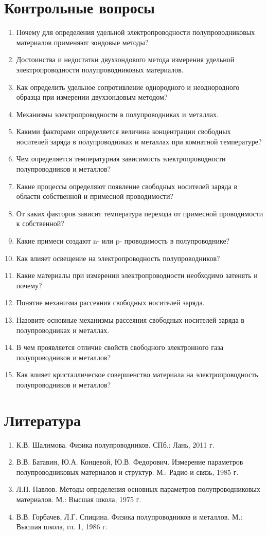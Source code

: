 \section{Контрольные вопросы}
\begin{enumerate}
\item Почему для определения удельной электропроводности полупроводниковых материалов применяют зондовые методы?
\item Достоинства и недостатки двухзондового метода измерения удельной электропроводности полупроводниковых материалов.
\item Как определить удельное сопротивление однородного и неоднородного образца при измерении двухзондовым методом?
\item Механизмы электропроводности в полупроводниках и металлах.
\item Какими факторами определяется величина концентрации свободных носителей заряда в полупроводниках и металлах при комнатной температуре?
\item Чем определяется температурная зависимость электропроводности полупроводников и металлов?
\item Какие процессы определяют появление свободных носителей заряда в области собственной и примесной проводимости?
\item От каких факторов зависит температура перехода от примесной проводимости к собственной?
\item Какие примеси создают n- или p- проводимость в полупроводнике?
\item Как влияет освещение на электропроводность полупроводников?
\item Какие материалы при измерении электропроводности необходимо затенять и почему?
\item Понятие механизма рассеяния свободных носителей заряда.
\item Назовите основные механизмы рассеяния свободных носителей заряда в полупроводниках и металлах.
\item В чем проявляется отличие свойств свободного электронного газа полупроводников и металлов?
\item Как влияет кристаллическое совершенство материала на электропроводность полупроводников и металлов?
\end{enumerate}

\section{Литература}
\begin{enumerate}
\item К.В. Шалимова. Физика полупроводников. СПб.: Лань, 2011 г.
\item В.В. Батавин, Ю.А. Концевой, Ю.В. Федорович. Измерение параметров полупроводниковых материалов и структур. М.: Радио и связь, 1985 г.
\item Л.П. Павлов. Методы определения основных параметров полупроводниковых материалов. М.: Высшая школа, 1975 г.
\item В.В. Горбачев, Л.Г. Спицина. Физика полупроводников и металлов. М.: Высшая школа, гл. 1, 1986 г.
\end{enumerate}